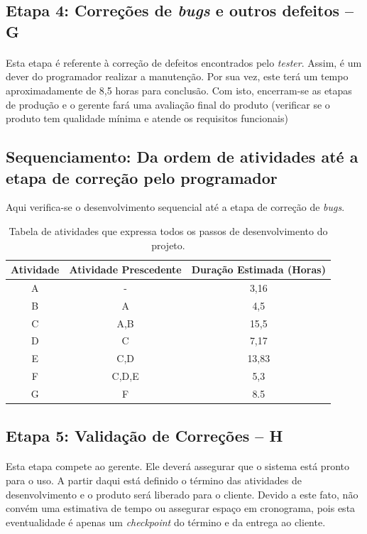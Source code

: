 \documentclass[12pt,a4paper]{article}
\begin{document}
		
		\subsection{Etapa 4: Correções de \textit{bugs} e outros defeitos -- G}
		\paragraph{} Esta etapa é referente à correção de defeitos encontrados pelo \textit{tester}. Assim, é um dever do programador realizar a manutenção. Por sua vez, este terá um tempo aproximadamente de 8,5 horas para conclusão.	Com isto, encerram-se as etapas de produção e o gerente fará uma avaliação final do produto (verificar se o produto tem qualidade mínima e atende os requisitos funcionais)
		\subsection{Sequenciamento: Da ordem de atividades até a etapa de correção pelo programador}
		Aqui verifica-se o desenvolvimento sequencial até a etapa de correção de \textit{bugs}.
		\begin{table}[!ht]
		\centering
        \begin{tabular}{|c|c|c|}
        \hline 
        Atividade & Atividade Prescedente & Duração Estimada (Horas) \\ 
		 \hline 
		A & - & 3,16 \\ 
		\hline 
		B & A & 4,5 \\         
        \hline 
        C & A,B & 15,5 \\ 
        \hline 
        D & C & 7,17 \\ 
        \hline 
        E & C,D & 13,83 \\ 
        \hline 	
        F & C,D,E &  5,3 \\
        \hline
        G & F & 8.5 \\
        \hline
        
        \end{tabular}	
        \caption{Tabela de atividades que expressa todos os passos de desenvolvimento do projeto.}
		\end{table}
		\subsection{Etapa 5: Validação de Correções -- H}
		\paragraph{} Esta etapa compete ao gerente. Ele deverá assegurar que o sistema está pronto para o uso. A partir daqui está definido o término das atividades de desenvolvimento e o produto será liberado para o cliente. Devido a este fato, não convém uma estimativa de tempo ou assegurar espaço em cronograma, pois esta eventualidade é apenas um \textit{checkpoint} do término e da entrega ao cliente.
\end{document}
